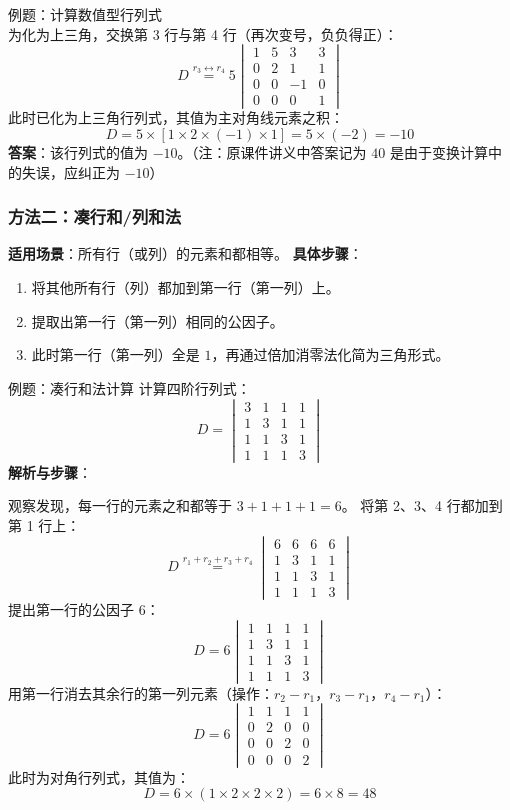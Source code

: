 \documentclass{ctexart}
\begin{document}
\begin{examplebox}{例题：计算数值型行列式}
\[  \]
  为化为上三角，交换第 3 行与第 4 行（再次变号，负负得正）：
  \[
  D \overset{r_3 \leftrightarrow r_4}{=} 5 \begin{vmatrix} 1 & 5 & 3 & 3 \\ 0 & 2 & 1 & 1 \\ 0 & 0 & -1 & 0 \\ 0 & 0 & 0 & 1 \end{vmatrix}
  \]
  此时已化为上三角行列式，其值为主对角线元素之积：
  \[
  D = 5 \times [1 \times 2 \times (-1) \times 1] = 5 \times (-2) = -10
  \]
  \textbf{答案}：该行列式的值为 $-10$。（注：原课件讲义中答案记为 $40$ 是由于变换计算中的失误，应纠正为 $-10$）
\end{examplebox}

\subsubsection{方法二：凑行和/列和法}
\textbf{适用场景}：所有行（或列）的元素和都相等。
\textbf{具体步骤}：
\begin{enumerate}
  \item 将其他所有行（列）都加到第一行（第一列）上。
  \item 提取出第一行（第一列）相同的公因子。
  \item 此时第一行（第一列）全是 $1$，再通过倍加消零法化简为三角形式。
\end{enumerate}

\begin{examplebox}{例题：凑行和法计算}
  计算四阶行列式：
  \[
  D = \begin{vmatrix} 3 & 1 & 1 & 1 \\ 1 & 3 & 1 & 1 \\ 1 & 1 & 3 & 1 \\ 1 & 1 & 1 & 3 \end{vmatrix}
  \]
  \textbf{解析与步骤}：
  
  观察发现，每一行的元素之和都等于 $3+1+1+1=6$。
  将第 2、3、4 行都加到第 1 行上：
  \[
  D \overset{r_1 + r_2 + r_3 + r_4}{=} \begin{vmatrix} 6 & 6 & 6 & 6 \\ 1 & 3 & 1 & 1 \\ 1 & 1 & 3 & 1 \\ 1 & 1 & 1 & 3 \end{vmatrix}
  \]
  提出第一行的公因子 $6$：
  \[
  D = 6 \begin{vmatrix} 1 & 1 & 1 & 1 \\ 1 & 3 & 1 & 1 \\ 1 & 1 & 3 & 1 \\ 1 & 1 & 1 & 3 \end{vmatrix}
  \]
  用第一行消去其余行的第一列元素（操作：$r_2 - r_1$，$r_3 - r_1$，$r_4 - r_1$）：
  \[
  D = 6 \begin{vmatrix} 1 & 1 & 1 & 1 \\ 0 & 2 & 0 & 0 \\ 0 & 0 & 2 & 0 \\ 0 & 0 & 0 & 2 \end{vmatrix}
  \]
  此时为对角行列式，其值为：
  \[
  D = 6 \times (1 \times 2 \times 2 \times 2) = 6 \times 8 = 48
  \]
\end{examplebox}
\end{document}
